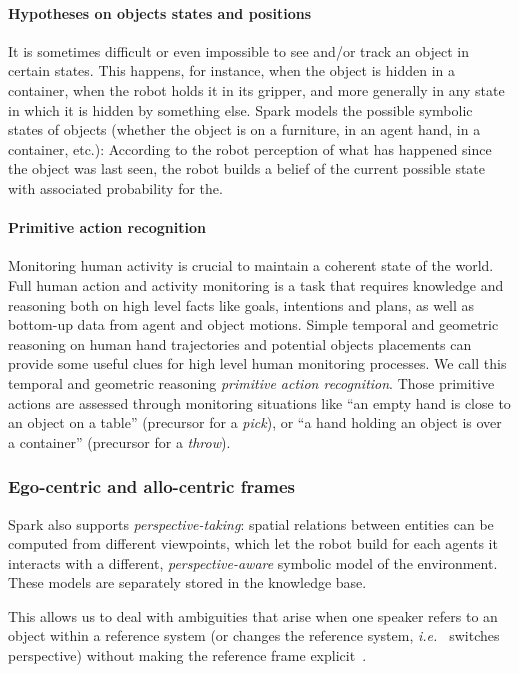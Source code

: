 \documentclass[preprint,3p,times]{elsarticle}
\newcommand{\ie}{{\textit{i.e.\ }}}
\begin{document}
\paragraph{Hypotheses on objects states and positions}
It is sometimes difficult or even impossible to see and/or track an
object in certain states. This happens, for instance, when the object
is hidden in a container, when the robot holds it in its gripper, and more
generally in any state in which it is hidden by something else. {\sc Spark} models the possible symbolic states of objects (whether the object is on a furniture, in an agent hand,
in a container, etc.): According to the robot perception of what has
happened since the object was last seen, the robot builds a
belief of the current possible state with associated probability for the.

\paragraph{Primitive action recognition} Monitoring human activity is crucial
to maintain a coherent state of the world. Full human action and activity
monitoring is a task that requires knowledge and reasoning both on high level
facts like goals, intentions and plans, as well as bottom-up data from agent
and object motions. Simple temporal and geometric reasoning on human hand
trajectories and potential objects placements can provide some useful clues for
high level human monitoring processes. We call this temporal and geometric
reasoning \emph{primitive action recognition}. Those primitive actions are
assessed through monitoring situations like ``an empty hand is close to an
object on a table'' (precursor for a \emph{pick}), or ``a hand holding an
object is over a container'' (precursor for a \emph{throw}).

\subsubsection{Ego-centric and allo-centric frames}

{\sc Spark} also supports \emph{perspective-taking}: spatial relations between entities can
be computed from different viewpoints, which let the robot build for each
agents it interacts with a different, \emph{perspective-aware} symbolic model
of the environment. These models are separately stored in the knowledge base.

This allows us to deal with ambiguities that arise when one speaker refers to
an object within a reference system (or changes the reference system, \ie
switches perspective) without making the reference frame
explicit~\cite{Breazeal2006, Ros2010}.
\end{document}

